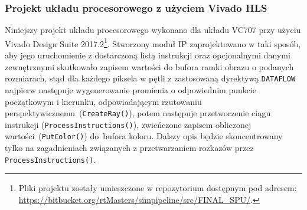 \subsubsection{Projekt układu procesorowego z użyciem Vivado HLS}
Niniejszy projekt układu procesorowego wykonano dla układu VC707 przy użyciu Vivado Design Suite 2017.2\footnote{Pliki projektu zostały umieszczone w repozytorium dostępnym pod adresem:
\url{https://bitbucket.org/rtMasters/simpipeline/src/FINAL_SPU/}.}. Stworzony moduł IP zaprojektowano w taki sposób, aby jego uruchomienie z dostarczoną listą instrukcji oraz opcjonalnymi danymi zewnętrznymi skutkowało zapisem wartości do bufora ramki obrazu o podanych rozmiarach, stąd dla każdego piksela w pętli z zastosowaną dyrektywą \texttt{DATAFLOW} najpierw następuje wygenerowanie promienia o odpowiednim punkcie początkowym i kierunku, odpowiadającym rzutowaniu perspektywicznemu~(\texttt{CreateRay()}), potem następuje przetworzenie ciągu instrukcji (\texttt{ProcessInstructions()}), zwieńczone zapisem obliczonej wartości~(\texttt{PutColor()}) do~bufora koloru. Dalszy opis będzie skoncentrowany tylko na zagadnieniach związanych z przetwarzaniem rozkazów przez \texttt{ProcessInstructions()}.
